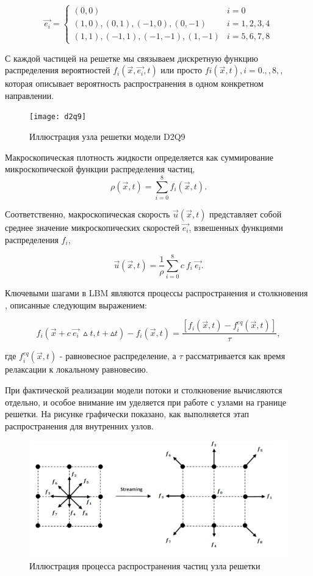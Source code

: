 			\begin{equation*}
				\vec{e_i} = 
				\begin{cases}
					(0,0) &i = 0\\
					(1, 0),(0, 1),(-1, 0),(0, -1) & i = 1, 2, 3, 4\\
					(1, 1),(-1, 1),(-1, -1),(1, -1) & i = 5, 6, 7, 8
				\end{cases}
			\end{equation*}
			
			С каждой частицей на решетке мы связываем дискретную функцию распределения вероятностей $ f_i (\vec{x},\vec{e_i}, t) $ или просто $ fi (\vec{x}, t), i = 0. , , 8, $, которая описывает вероятность распространения в одном конкретном направлении.
		
			\begin{figure}[h]
				\centering
				\texttt{[image: d2q9]}
				\caption{Иллюстрация узла решетки модели D2Q9}
				\label{fig:d2q9}
			\end{figure}
		
			Макроскопическая плотность жидкости определяется как суммирование микроскопической функции распределения частиц,
					\[ \rho(\vec{x},t) = \sum_{i=0}^8 f_i(\vec{x}, t) .\]
					
			Соответственно, макроскопическая скорость $\vec{u}(\vec{x},t) $ представляет собой среднее значение микроскопических скоростей $ \vec{e_i} $, взвешенных функциями распределения $ f_i $,
			
			\[ \vec{u}(\vec{x},t) = \frac{1}{\rho} \sum_{i=0}^8 c~f_i~\vec{e_i}.\]
			
			Ключевыми шагами в LBM являются процессы распространения и столкновения , описанные следующим выражением:
			
			\[f_i(\vec{x}+c~\vec{e_i}~\vartriangle t, t+\vartriangle t) - f_i(\vec{x}, t) = \dfrac{[f_i(\vec{x}, t) - f_i^{eq}(\vec{x}, t)]}{\tau},\]
			
			где $ f_i^{eq}(\vec{x}, t) $ - равновесное распределение, а $ \tau $ рассматривается как время релаксации к локальному равновесию.
			
			При фактической реализации модели потоки и столкновение вычисляются отдельно, и особое внимание им уделяется при работе с узлами на границе решетки. На рисунке  графически показано, как выполняется этап распространения для внутренних узлов.
	
			\begin{figure}[h]
				\centering
				\includegraphics[width=0.6\linewidth]{images/streaming}
				\caption{Иллюстрация процесса распространения частиц узла решетки}
				\label{fig:streaming}
			\end{figure}
			
